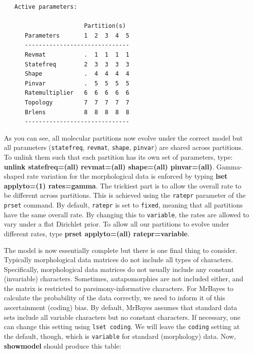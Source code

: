 \documentclass[12pt]{book}
\begin{document}
\begin{singlespacing}
\small
\begin{verbatim}
   Active parameters:
 
                       Partition(s)
      Parameters       1  2  3  4  5
      ------------------------------
      Revmat           .  1  1  1  1
      Statefreq        2  3  3  3  3
      Shape            .  4  4  4  4
      Pinvar           .  5  5  5  5
      Ratemultiplier   6  6  6  6  6
      Topology         7  7  7  7  7
      Brlens           8  8  8  8  8
      ------------------------------
\end{verbatim}
\normalsize
\end{singlespacing}

As you can see, all molecular partitions now evolve under the correct model but all parameters
(\texttt{statefreq}, \texttt{revmat}, \texttt{shape}, \texttt{pinvar}) are shared across
partitions. To unlink them such that each partition has its own set of parameters, type:
\textbf{unlink statefreq=(all) revmat=(all) shape=(all) pinvar=(all)}. Gamma-shaped rate variation
for the morphological data is enforced by typing \textbf{lset applyto=(1) rates=gamma}. The
trickiest part is to allow the overall rate to be different across partitions. This is achieved
using the \texttt{ratepr} parameter of the \texttt{prset} command. By default, \texttt{ratepr} is
set to \texttt{fixed}, meaning that all partitions have the same overall rate.  By changing this to
\texttt{variable}, the rates are allowed to vary under a flat Dirichlet prior. To allow all our
partitions to evolve under different rates, type \textbf{prset applyto=(all) ratepr=variable}.

The model is now essentially complete but there is one final thing to consider. Typically
morphological data matrices do not include all types of characters. Specifically, morphological
data matrices do not usually include any constant (invariable) characters. Sometimes,
autapomorphies are not included either, and the matrix is restricted to parsimony-informative
characters. For MrBayes to calculate the probability of the data correctly, we need to inform it of
this ascertainment (coding) bias. By default, MrBayes assumes that standard data sets include all
variable characters but no constant characters. If necessary, one can change this setting using
\texttt{lset coding}. We will leave the \texttt{coding} setting at the default, though, which is
\texttt{variable} for standard (morphology) data. Now, \textbf{showmodel} should produce this
table:
\end{document}
